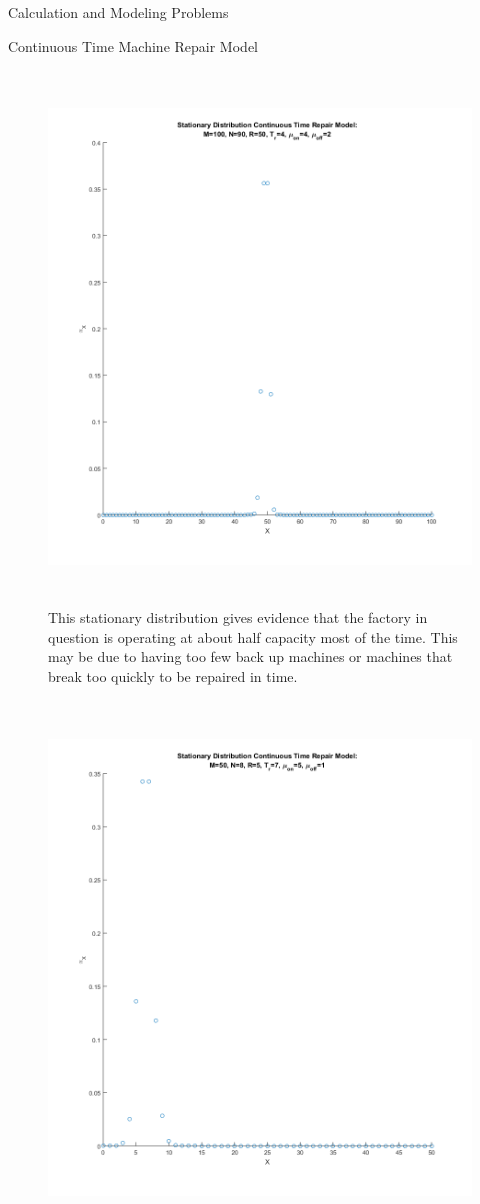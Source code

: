 \documentclass[12pt]{article}
\numberwithin{equation}{section}
\begin{document}
\begin{section}{Calculation and Modeling Problems}
\begin{subsection}{Continuous Time Machine Repair Model}
\begin{figure}
\includegraphics[width=400pt,height=400pt,keepaspectratio]{RepairModelStationaryDist2.png}
\caption{This stationary distribution gives evidence that the factory in question is operating at about half capacity most of the time. This may be due to having too few back up machines or machines that break too quickly to be repaired in time.}
\end{figure}
\begin{figure}
\centering
\includegraphics[width=400pt,height=400pt,keepaspectratio]{repairModelStationaryDist3.png}

\end{figure}
\end{subsection}
\end{section}
\end{document}

